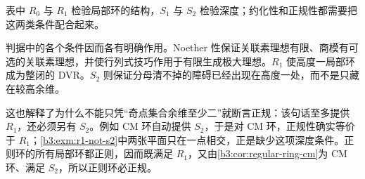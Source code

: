 表中 \(R_0\) 与 \(R_1\) 检验局部环的结构，\(S_1\) 与 \(S_2\) 检验深度；约化性和正规性都需要把这两类条件配合起来。

\ProseParagraphBreak
判据中的各个条件因而各有明确作用。Noether 性保证关联素理想有限、商模有可选的关联素理想，并使行列式技巧作用于有限生成极大理想。\(R_1\) 使高度一局部环成为整闭的 DVR。\(S_2\) 则保证分母清不掉的障碍已经出现在高度一处，而不是只藏在较高余维。

\ProseParagraphBreak
这也解释了为什么不能只凭“奇点集合余维至少二”就断言正规：该句话至多提供 \(R_1\)，还必须另有 \(S_2\)。例如 CM 环自动提供 \(S_2\)，于是对 CM 环，正规性确实等价于 \(R_1\)；\cref{b3:exm:r1-not-s2}中两张平面只在一点相交，正是缺少这项深度条件。正则环的所有局部环都正则，因而既满足 \(R_1\)，又由\cref{b3:cor:regular-ring-cm}为 CM 环、满足 \(S_2\)，所以正则环必正规。
